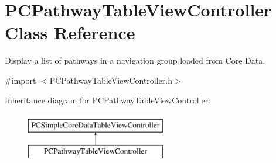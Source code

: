 \hypertarget{interface_p_c_pathway_table_view_controller}{
\section{PCPathwayTableViewController Class Reference}
\label{interface_p_c_pathway_table_view_controller}
}


Display a list of pathways in a navigation group loaded from Core Data.  




{\ttfamily \#import $<$PCPathwayTableViewController.h$>$}

Inheritance diagram for PCPathwayTableViewController:\begin{figure}[h!]
\begin{center}
\leavevmode
\includegraphics[height=2.000000cm]{kegg_doc/interface_p_c_pathway_table_view_controller}
\end{center}
\end{figure}
